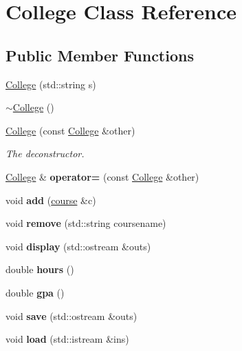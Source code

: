 \hypertarget{classCollege}{}\section{College Class Reference}
\label{classCollege}
\subsection*{Public Member Functions}
\begin{DoxyCompactItemize}
\item 
\hyperlink{classCollege_adabaf4087355e83f9f7d39f1e1498b41}{College} (std\+::string s)
\item 
\hyperlink{classCollege_a42fcce4f87439592eaefd96564a796a8}{$\sim$\+College} ()
\item 
\hyperlink{classCollege_ad007ad488e5a7ef986114080d0c8e101}{College} (const \hyperlink{classCollege}{College} \&other)
\begin{DoxyCompactList}\small\item\em The deconstructor. \end{DoxyCompactList}\item 
\hyperlink{classCollege}{College} \& {\bfseries operator=} (const \hyperlink{classCollege}{College} \&other)\hypertarget{classCollege_af2194c9b37f80d13dc3fdba6784b18e8}{}\label{classCollege_af2194c9b37f80d13dc3fdba6784b18e8}

\item 
void {\bfseries add} (\hyperlink{classcourse}{course} \&c)\hypertarget{classCollege_a67fd1d8970b46b24ce2e0dd72598a22f}{}\label{classCollege_a67fd1d8970b46b24ce2e0dd72598a22f}

\item 
void {\bfseries remove} (std\+::string coursename)\hypertarget{classCollege_a4d2ae513b36e6421fb1ca2c08459cfe6}{}\label{classCollege_a4d2ae513b36e6421fb1ca2c08459cfe6}

\item 
void {\bfseries display} (std\+::ostream \&outs)\hypertarget{classCollege_a52ca0a164483cf5c05591cd0fb8b300c}{}\label{classCollege_a52ca0a164483cf5c05591cd0fb8b300c}

\item 
double {\bfseries hours} ()\hypertarget{classCollege_a8a7a762611a1d7e00c453390d49355fd}{}\label{classCollege_a8a7a762611a1d7e00c453390d49355fd}

\item 
double {\bfseries gpa} ()\hypertarget{classCollege_aaf9bfaa0bc717e96da6365661a96fcd0}{}\label{classCollege_aaf9bfaa0bc717e96da6365661a96fcd0}

\item 
void {\bfseries save} (std\+::ostream \&outs)\hypertarget{classCollege_af6b419f813bc990c0e11f99b78a26899}{}\label{classCollege_af6b419f813bc990c0e11f99b78a26899}

\item 
void {\bfseries load} (std\+::istream \&ins)\hypertarget{classCollege_a11422094ddd907705daede7aa537dd73}{}\label{classCollege_a11422094ddd907705daede7aa537dd73}

\end{DoxyCompactItemize}


